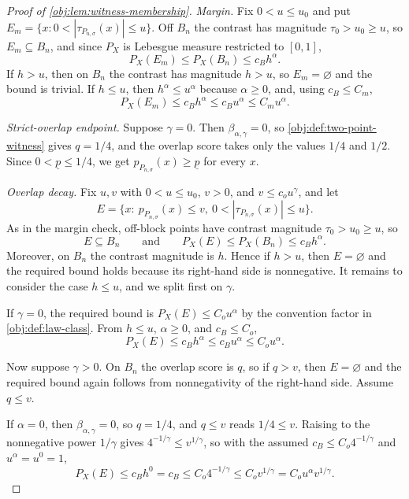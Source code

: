 \documentclass[11pt]{article}
\begin{document}
\begin{proof}[Proof of \cref{obj:lem:witness-membership}]
\emph{Margin.}  Fix \(0<u\le u_0\) and put \(E_m=\{x:0<|\tau_{P_{n,\sigma}}(x)|\le u\}\).  Off \(B_n\) the contrast has magnitude \(\tau_0>u_0\ge u\), so \(E_m\subseteq B_n\), and since \(P_X\) is Lebesgue measure restricted to \([0,1]\),
\[
P_X(E_m)\le P_X(B_n)\le c_Bh^\alpha .
\]
If \(h>u\), then on \(B_n\) the contrast has magnitude \(h>u\), so \(E_m=\varnothing\) and the bound is trivial.  If \(h\le u\), then \(h^\alpha\le u^\alpha\) because \(\alpha\ge0\), and, using \(c_B\le C_m\),
\[
P_X(E_m)\le c_Bh^\alpha\le c_Bu^\alpha\le C_mu^\alpha .
\]

\emph{Strict-overlap endpoint.}  Suppose \(\gamma=0\).  Then \(\beta_{\alpha,\gamma}=0\), so \cref{obj:def:two-point-witness} gives \(q=1/4\), and the overlap score takes only the values \(1/4\) and \(1/2\).  Since \(0<\underline p\le1/4\), we get \(p_{P_{n,\sigma}}(x)\ge\underline p\) for every \(x\). %

\emph{Overlap decay.}  Fix \(u,v\) with \(0<u\le u_0\), \(v>0\), and \(v\le c_ou^\gamma\), and let
\[
E=\{x:\ p_{P_{n,\sigma}}(x)\le v,\ 0<|\tau_{P_{n,\sigma}}(x)|\le u\}.
\]
As in the margin check, off-block points have contrast magnitude \(\tau_0>u_0\ge u\), so
\[
E\subseteq B_n
\qquad\text{and}\qquad
P_X(E)\le P_X(B_n)\le c_Bh^\alpha .
\]
Moreover, on \(B_n\) the contrast magnitude is \(h\).  Hence if \(h>u\), then \(E=\varnothing\) and the required bound holds because its right-hand side is nonnegative.  It remains to consider the case \(h\le u\), and we split first on \(\gamma\).

If \(\gamma=0\), the required bound is \(P_X(E)\le C_ou^\alpha\) by the convention factor in \cref{obj:def:law-class}.  From \(h\le u\), \(\alpha\ge0\), and \(c_B\le C_o\),
\[
P_X(E)\le c_Bh^\alpha\le c_Bu^\alpha\le C_ou^\alpha .
\]

Now suppose \(\gamma>0\).  On \(B_n\) the overlap score is \(q\), so if \(q>v\), then \(E=\varnothing\) and the required bound again follows from nonnegativity of the right-hand side.  Assume \(q\le v\).

If \(\alpha=0\), then \(\beta_{\alpha,\gamma}=0\), so \(q=1/4\), and \(q\le v\) reads \(1/4\le v\).  Raising to the nonnegative power \(1/\gamma\) gives \(4^{-1/\gamma}\le v^{1/\gamma}\), so with the assumed \(c_B\le C_o4^{-1/\gamma}\) and \(u^\alpha=u^0=1\),
\[
P_X(E)\le c_Bh^0=c_B\le C_o4^{-1/\gamma}\le C_o v^{1/\gamma}=C_ou^\alpha v^{1/\gamma}.
\]


\end{proof}
\end{document}
